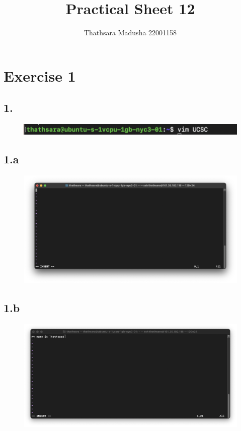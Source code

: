 \documentclass{article}
\title{Practical Sheet 12}
\author{Thathsara Madusha 22001158}
\begin{document}
    \maketitle

    \section*{Exercise 1}

    \subsection*{1.}
    \begin{figure}[H]
        \centering
        \includegraphics[width=\textwidth]{1/1_0.png}
    \end{figure}

    \subsection*{1.a}
    \begin{figure}[H]
        \centering
        \includegraphics[width=\textwidth]{1/1_a.png}
    \end{figure}

    \subsection*{1.b}
    \begin{figure}[H]
        \centering
        \includegraphics[width=\textwidth]{1/1_b.png}
    \end{figure}
\end{document}
